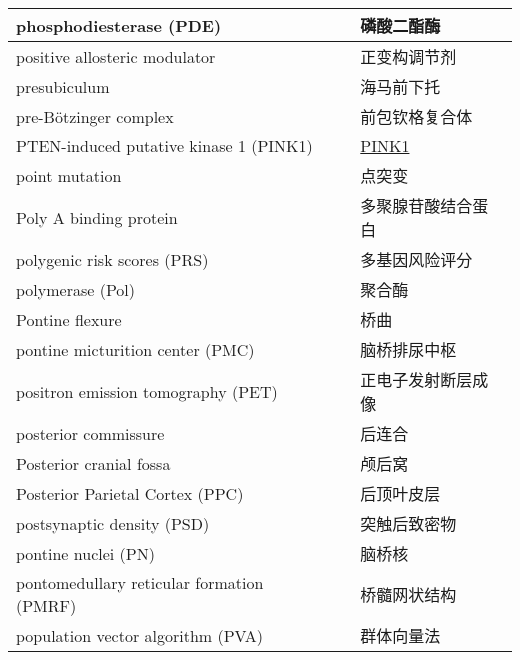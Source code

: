 \begin{longtable}{lll}
	\midrule
	phosphodiesterase (PDE)  && 磷酸二酯酶   \\
	
	\midrule
	positive allosteric modulator   && 正变构调节剂   \\
	
	\midrule
	presubiculum   && 海马前下托   \\
	
	\midrule
	pre-Bötzinger complex   && 前包钦格复合体   \\
	
	\midrule
	PTEN-induced putative kinase 1 (PINK1)     && \href{https://baike.baidu.com/item/PINK1/5405430}{PINK1}   \\
	
	\midrule
	point mutation     && 点突变   \\
	
	\midrule
	Poly A binding protein     && 多聚腺苷酸结合蛋白   \\
	
	\midrule
	polygenic risk scores (PRS)     && 多基因风险评分   \\
	
	\midrule
	polymerase (Pol)     && 聚合酶   \\
	
	\midrule
	Pontine flexure     && 桥曲   \\
	
	\midrule
	pontine micturition center  (PMC)   && 脑桥排尿中枢   \\
	
	\midrule
	positron emission tomography (PET)     && 正电子发射断层成像   \\
	
	\midrule
	posterior commissure     && 后连合   \\
	
	\midrule
	Posterior cranial fossa     && 颅后窝   \\
	
	\midrule
	Posterior Parietal Cortex (PPC)     && 后顶叶皮层   \\
	
	\midrule
	postsynaptic density (PSD)     && 突触后致密物   \\
	
	\midrule
	pontine nuclei (PN)    && 	脑桥核   \\
	
	\midrule
	pontomedullary reticular formation (PMRF)   && 	桥髓网状结构   \\
	
	\midrule
	population vector algorithm (PVA)   && 	群体向量法   \\
	

\end{longtable}
